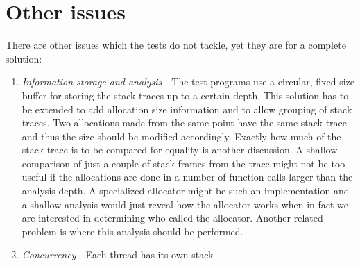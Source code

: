 \section{Other issues}
\label{section:otherissues}

There are other issues which the tests do not tackle, yet they are for a complete solution:
\begin{enumerate}
\item \textit{Information storage and analysis} - The test programs use a circular, fixed size buffer for storing the stack traces up to a certain depth. This solution has to be extended to add allocation size information and to allow grouping of stack traces. Two allocations made from the same point have the same stack trace and thus the size should be modified accordingly. Exactly how much of the stack trace is to be compared for equality is another discussion. A shallow comparison of just a couple of stack frames from the trace might not be too useful if the allocations are done in a number of function calls larger than the analysis depth. A specialized allocator might be such an implementation and a shallow analysis would just reveal how the allocator works when in fact we are interested in determining who called the allocator. Another related problem is where this analysis should be performed.
\item \textit{Concurrency} - Each thread has its own stack
\end{enumerate}

